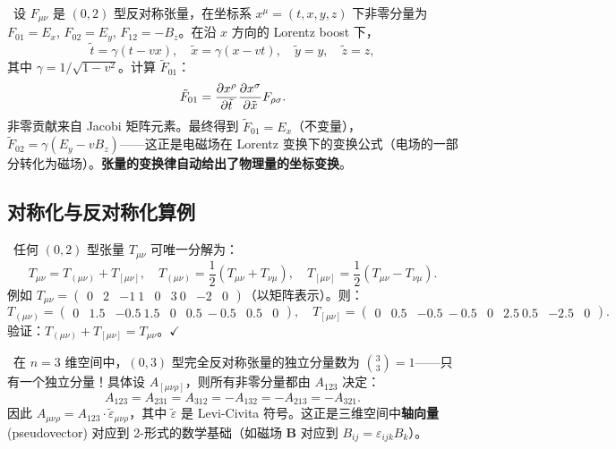 \
设 $F_{\mu\nu}$ 是 $(0,2)$ 型反对称张量，在坐标系 $x^\mu = (t, x, y, z)$ 下非零分量为 $F_{01} = E_x$, $F_{02} = E_y$, $F_{12} = -B_z$。在沿 $x$ 方向的 Lorentz boost 下，
\begin{equation}
    \tilde{t} = \gamma(t - vx), \quad \tilde{x} = \gamma(x - vt), \quad \tilde{y} = y, \quad \tilde{z} = z,
\end{equation}
其中 $\gamma = 1/\sqrt{1-v^2}$。计算 $\tilde{F}_{01}$：
\begin{equation}
    \tilde{F}_{01} = \frac{\partial x^\rho}{\partial \tilde{t}} \frac{\partial x^\sigma}{\partial \tilde{x}} F_{\rho\sigma}.
\end{equation}
非零贡献来自 Jacobi 矩阵元素。最终得到 $\tilde{F}_{01} = E_x$（不变量），$\tilde{F}_{02} = \gamma(E_y - v B_z)$——这正是电磁场在 Lorentz 变换下的变换公式（电场的一部分转化为磁场）。\textbf{张量的变换律自动给出了物理量的坐标变换}。

\subsection{对称化与反对称化算例}

\
任何 $(0,2)$ 型张量 $T_{\mu\nu}$ 可唯一分解为：
\begin{equation}
    T_{\mu\nu} = T_{(\mu\nu)} + T_{[\mu\nu]}, \quad T_{(\mu\nu)} = \frac{1}{2}(T_{\mu\nu} + T_{\nu\mu}), \quad T_{[\mu\nu]} = \frac{1}{2}(T_{\mu\nu} - T_{\nu\mu}).
\end{equation}
例如 $T_{\mu\nu} = \begin{pmatrix} 0 & 2 & -1 \ 1 & 0 & 3 \ 0 & -2 & 0 \end{pmatrix}$（以矩阵表示）。则：
\begin{equation}
    T_{(\mu\nu)} = \begin{pmatrix} 0 & 1.5 & -0.5 \ 1.5 & 0 & 0.5 \ -0.5 & 0.5 & 0 \end{pmatrix}, \quad
    T_{[\mu\nu]} = \begin{pmatrix} 0 & 0.5 & -0.5 \ -0.5 & 0 & 2.5 \ 0.5 & -2.5 & 0 \end{pmatrix}.
\end{equation}
验证：$T_{(\mu\nu)} + T_{[\mu\nu]} = T_{\mu\nu}$。$\checkmark$

\
在 $n=3$ 维空间中，$(0,3)$ 型完全反对称张量的独立分量数为 $\binom{3}{3} = 1$——只有一个独立分量！具体设 $A_{[\mu\nu\rho]}$，则所有非零分量都由 $A_{123}$ 决定：
\begin{equation}
    A_{123} = A_{231} = A_{312} = -A_{132} = -A_{213} = -A_{321}.
\end{equation}
因此 $A_{\mu\nu\rho} = A_{123} \cdot \tilde{\varepsilon}_{\mu\nu\rho}$，其中 $\tilde{\varepsilon}$ 是 Levi-Civita 符号。这正是三维空间中\textbf{轴向量} (pseudovector) 对应到 2-形式的数学基础（如磁场 $\mathbf{B}$ 对应到 $B_{ij} = \varepsilon_{ijk} B_k$）。

